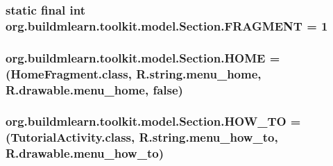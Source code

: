 \hypertarget{enumorg_1_1buildmlearn_1_1toolkit_1_1model_1_1Section_a536f7f08eb441bb4af16270238999cc4}{
\subsubsection[{F\-R\-A\-G\-M\-E\-N\-T}]{\setlength{\rightskip}{0pt plus 5cm} static  final int org.\-buildmlearn.\-toolkit.\-model.\-Section.\-F\-R\-A\-G\-M\-E\-N\-T = 1\hspace{0.3cm}{\ttfamily [static]}}}\label{enumorg_1_1buildmlearn_1_1toolkit_1_1model_1_1Section_a536f7f08eb441bb4af16270238999cc4}
\hypertarget{enumorg_1_1buildmlearn_1_1toolkit_1_1model_1_1Section_aa21b990b779598b93484c13cc883b2e9}{
\subsubsection[{H\-O\-M\-E}]{\setlength{\rightskip}{0pt plus 5cm}org.\-buildmlearn.\-toolkit.\-model.\-Section.\-H\-O\-M\-E =(Home\-Fragment.\-class, R.\-string.\-menu\-\_\-home, R.\-drawable.\-menu\-\_\-home, false)}}\label{enumorg_1_1buildmlearn_1_1toolkit_1_1model_1_1Section_aa21b990b779598b93484c13cc883b2e9}
\hypertarget{enumorg_1_1buildmlearn_1_1toolkit_1_1model_1_1Section_a339a902a73ccf5feded7345c716511a9}{
\subsubsection[{H\-O\-W\-\_\-\-T\-O}]{\setlength{\rightskip}{0pt plus 5cm}org.\-buildmlearn.\-toolkit.\-model.\-Section.\-H\-O\-W\-\_\-\-T\-O =(Tutorial\-Activity.\-class, R.\-string.\-menu\-\_\-how\-\_\-to, R.\-drawable.\-menu\-\_\-how\-\_\-to)}}\label{enumorg_1_1buildmlearn_1_1toolkit_1_1model_1_1Section_a339a902a73ccf5feded7345c716511a9}
